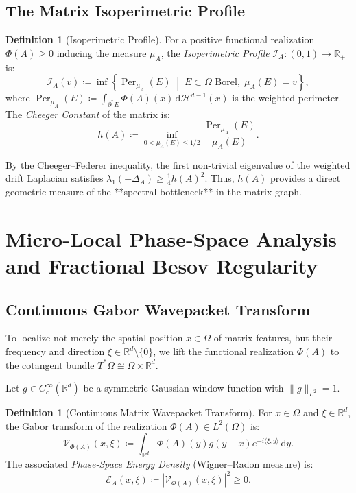 \documentclass[11pt,a4paper,reqno]{amsart}
\theoremstyle{definition}
\newtheorem{definition}[theorem]{Definition}
\numberwithin{equation}{section}
\newcommand{\R}{\mathbb{R}}
\newcommand{\Per}{\operatorname{Per}}
\newcommand{\dif}{\,\mathrm{d}}
\begin{document}
\subsection{The Matrix Isoperimetric Profile}
\begin{definition}[Isoperimetric Profile]
For a positive functional realization $\Phi(A) \ge 0$ inducing the measure $\mu_A$, the \emph{Isoperimetric Profile} $\mathcal{I}_A \colon (0, 1) \to \R_+$ is:
\begin{equation}
    \mathcal{I}_A(v) \coloneqq \inf \left\{ \Per_{\mu_A}(E) \;\middle|\; E \subset \Omega \text{ Borel}, \; \mu_A(E) = v \right\},
\end{equation}
where $\Per_{\mu_A}(E) \coloneqq \int_{\partial^* E} \Phi(A)(x) \dif \mathcal{H}^{d-1}(x)$ is the weighted perimeter.
The \emph{Cheeger Constant} of the matrix is:
\begin{equation}
    h(A) \coloneqq \inf_{0 < \mu_A(E) \le 1/2} \frac{\Per_{\mu_A}(E)}{\mu_A(E)}.
\end{equation}
\end{definition}
By the Cheeger--Federer inequality, the first non-trivial eigenvalue of the weighted drift Laplacian satisfies $\lambda_1(-\Delta_A) \ge \frac{1}{4} h(A)^2$. Thus, $h(A)$ provides a direct geometric measure of the **spectral bottleneck** in the matrix graph.

\section{Micro-Local Phase-Space Analysis and Fractional Besov Regularity}
\label{sec:microlocal}

\subsection{Continuous Gabor Wavepacket Transform}
To localize not merely the spatial position $x \in \Omega$ of matrix features, but their frequency and direction $\xi \in \R^d \setminus \{0\}$, we lift the functional realization $\Phi(A)$ to the cotangent bundle $T^*\Omega \cong \Omega \times \R^d$.

Let $g \in C_c^\infty(\R^d)$ be a symmetric Gaussian window function with $\|g\|_{L^2} = 1$.
\begin{definition}[Continuous Matrix Wavepacket Transform]
For $x \in \Omega$ and $\xi \in \R^d$, the Gabor transform of the realization $\Phi(A) \in L^2(\Omega)$ is:
\begin{equation}
    \mathcal{V}_{\Phi(A)}(x, \xi) \coloneqq \int_{\R^d} \Phi(A)(y) g(y - x) e^{-i \langle \xi, y \rangle} \dif y.
\end{equation}
The associated \emph{Phase-Space Energy Density} (Wigner--Radon measure) is:
\begin{equation}
    \mathcal{E}_A(x, \xi) \coloneqq \left| \mathcal{V}_{\Phi(A)}(x, \xi) \right|^2 \ge 0.
\end{equation}
\end{definition}
\end{document}
